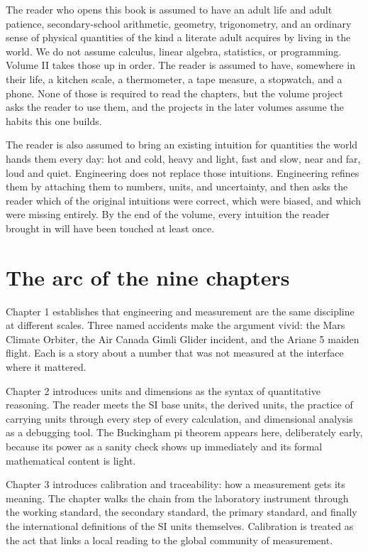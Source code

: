 The reader who opens this book is assumed to have an adult life and
adult patience, secondary-school arithmetic, geometry, trigonometry,
and an ordinary sense of physical quantities of the kind a literate
adult acquires by living in the world. We do not assume calculus,
linear algebra, statistics, or programming. Volume II takes those up
in order. The reader is assumed to have, somewhere in their life, a
kitchen scale, a thermometer, a tape measure, a stopwatch, and a
phone. None of those is required to read the chapters, but the
volume project asks the reader to use them, and the projects in the
later volumes assume the habits this one builds.

The reader is also assumed to bring an existing intuition for
quantities the world hands them every day: hot and cold, heavy and
light, fast and slow, near and far, loud and quiet. Engineering does
not replace those intuitions. Engineering refines them by attaching
them to numbers, units, and uncertainty, and then asks the reader
which of the original intuitions were correct, which were biased,
and which were missing entirely. By the end of the volume, every
intuition the reader brought in will have been touched at least
once.

\section*{The arc of the nine chapters}

Chapter 1 establishes that engineering and measurement are the same
discipline at different scales. Three named accidents make the
argument vivid: the Mars Climate Orbiter, the Air Canada Gimli
Glider incident, and the Ariane 5 maiden flight. Each is a story
about a number that was not measured at the interface where it
mattered.

Chapter 2 introduces units and dimensions as the syntax of
quantitative reasoning. The reader meets the SI base units, the
derived units, the practice of carrying units through every step of
every calculation, and dimensional analysis as a debugging tool. The
Buckingham pi theorem appears here, deliberately early, because its
power as a sanity check shows up immediately and its formal
mathematical content is light.

Chapter 3 introduces calibration and traceability: how a measurement
gets its meaning. The chapter walks the chain from the laboratory
instrument through the working standard, the secondary standard, the
primary standard, and finally the international definitions of the
SI units themselves. Calibration is treated as the act that links a
local reading to the global community of measurement.

